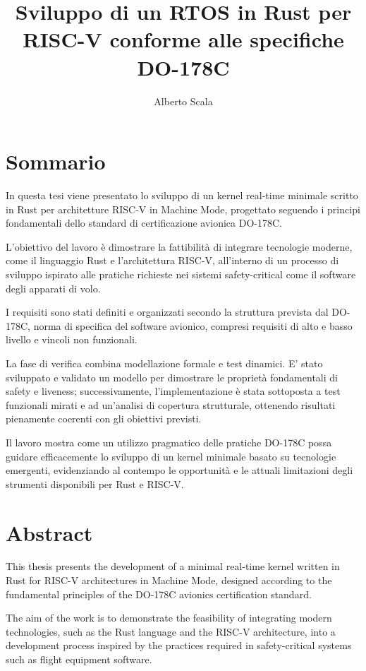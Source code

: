 \documentclass[italian, Lau, oneside]{sapthesis} %
\title{Sviluppo di un RTOS in Rust per RISC-V conforme alle specifiche DO-178C}
\author{Alberto Scala}
\begin{document}
\renewcommand{\leftmark}{}
\renewcommand{\rightmark}{}
\renewcommand{\headrulewidth}{0pt}

\frontmatter
\maketitle

\chapter*{Sommario}
In questa tesi viene presentato lo sviluppo di un kernel real-time minimale scritto in Rust per architetture RISC-V in Machine Mode, progettato seguendo i principi fondamentali dello standard di certificazione avionica DO-178C. 

L’obiettivo del lavoro è dimostrare la fattibilità di integrare tecnologie moderne, come il linguaggio Rust e l’architettura RISC-V, all’interno di un processo di sviluppo ispirato alle pratiche richieste nei sistemi safety-critical come il software degli apparati di volo.

I requisiti sono stati definiti e organizzati secondo la struttura prevista dal DO-178C, norma di specifica del software avionico, compresi requisiti di alto e basso livello e vincoli non funzionali.

La fase di verifica combina modellazione formale e test dinamici. E' stato sviluppato e validato un modello per dimostrare le proprietà fondamentali di safety e liveness; successivamente, l’implementazione è stata sottoposta a test funzionali mirati e ad un’analisi di copertura strutturale, ottenendo risultati pienamente coerenti con gli obiettivi previsti.

Il lavoro mostra come un utilizzo pragmatico delle pratiche DO-178C possa guidare efficacemente lo sviluppo di un kernel minimale basato su tecnologie emergenti, evidenziando al contempo le opportunità e le attuali limitazioni degli strumenti disponibili per Rust e RISC-V.

\chapter*{Abstract}
This thesis presents the development of a minimal real-time kernel written
in Rust for RISC-V architectures in Machine Mode, designed according to the fundamental principles of the DO-178C avionics certification standard.

The aim of the work is to demonstrate the feasibility of integrating modern technologies,
such as the Rust language and the RISC-V architecture, into a development process inspired by the practices required in safety-critical systems such as flight equipment software.
\end{document}
